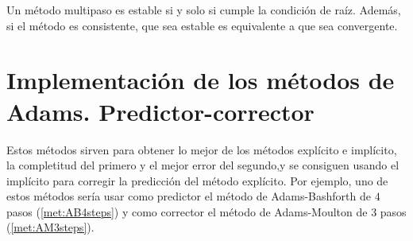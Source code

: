 \begin{theorem}
    Un método multipaso es estable si y solo si cumple la condición de raíz.
    Además, si el método es consistente,
    que sea estable es equivalente a que sea convergente.
\end{theorem}

\section{Implementación de los métodos de Adams. Predictor-corrector}

Estos métodos sirven para obtener lo mejor de los métodos explícito e implícito,
la completitud del primero y el mejor error del segundo,y se consiguen usando
el implícito para corregir la predicción del método explícito. Por ejemplo,
uno de estos métodos  sería usar como predictor el método de Adams-Bashforth 
de $4$ pasos (\cref{met:AB4steps}) y como corrector el método de Adams-Moulton
de $3$ pasos (\cref{met:AM3steps}).


